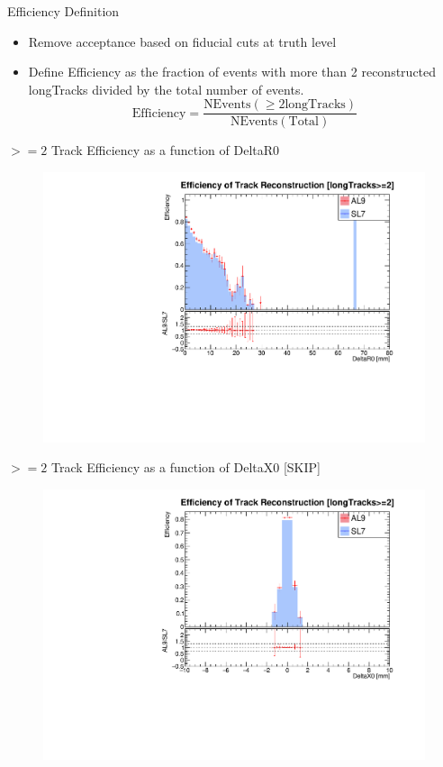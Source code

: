 \begin{frame}{Efficiency Definition}
    \begin{itemize}
        \item Remove acceptance based on fiducial cuts at truth level
        \item Define Efficiency as the fraction of events with more than 2 reconstructed longTracks divided by the total number of events. 
        \[ \text{Efficiency} = \frac{\text{NEvents}({\geq 2 \text{longTracks}})}{\text{NEvents}({\text{Total}})} \]
    \end{itemize}
\end{frame}

\begin{frame}{$>=2$ Track Efficiency as a function of DeltaR0}
    \begin{figure}
        \includegraphics[width=\linewidth]{./output/Effi_greq2_DeltaR0.pdf}
    \end{figure}
\end{frame}
\begin{frame}{$>=2$ Track Efficiency as a function of DeltaX0 [SKIP]}
    \begin{figure}
        \includegraphics[width=\linewidth]{./output/Effi_greq2_DeltaX0.pdf}

    \end{figure}
\end{frame}
